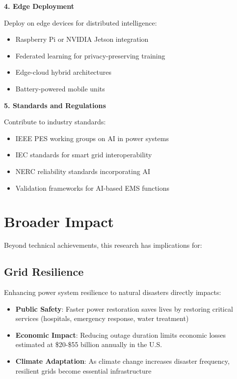 \documentclass[12pt,a4paper]{report}
\begin{document}
\textbf{4. Edge Deployment}

Deploy on edge devices for distributed intelligence:
\begin{itemize}
    \item Raspberry Pi or NVIDIA Jetson integration
    \item Federated learning for privacy-preserving training
    \item Edge-cloud hybrid architectures
    \item Battery-powered mobile units
\end{itemize}

\textbf{5. Standards and Regulations}

Contribute to industry standards:
\begin{itemize}
    \item IEEE PES working groups on AI in power systems
    \item IEC standards for smart grid interoperability
    \item NERC reliability standards incorporating AI
    \item Validation frameworks for AI-based EMS functions
\end{itemize}

\section{Broader Impact}

Beyond technical achievements, this research has implications for:

\subsection{Grid Resilience}

Enhancing power system resilience to natural disasters directly impacts:
\begin{itemize}
    \item \textbf{Public Safety}: Faster power restoration saves lives by restoring critical services (hospitals, emergency response, water treatment)
    \item \textbf{Economic Impact}: Reducing outage duration limits economic losses estimated at \$20-\$55 billion annually in the U.S.
    \item \textbf{Climate Adaptation}: As climate change increases disaster frequency, resilient grids become essential infrastructure
\end{itemize}
\end{document}
